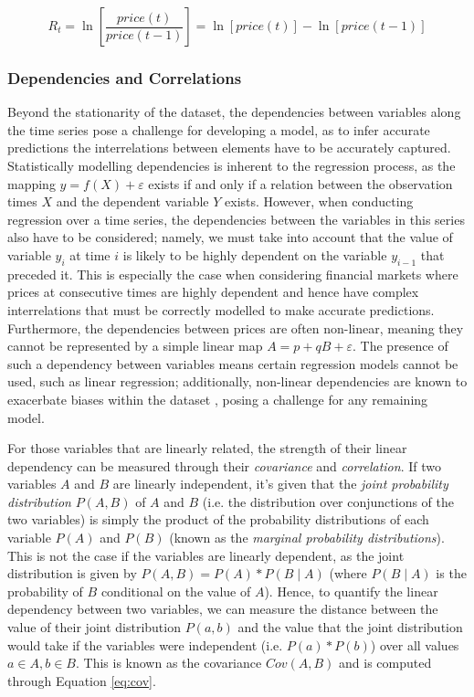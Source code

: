 \documentclass[a4paper, 11pt]{article}
\begin{document}
    \begin{equation}
        R_t = \ln \left[ \frac{price \left( t \right)}{price \left(t-1 \right)} \right] = \ln \left[ price \left(t \right) \right] - \ln \left[price \left(t-1 \right) \right]
        \label{eq:log-return}
    \end{equation}

    \subsubsection{Dependencies and Correlations}

    Beyond the stationarity of the dataset, the dependencies between variables along the time series pose a challenge for developing a model, as to infer accurate predictions the interrelations between elements have to be accurately captured. Statistically modelling dependencies is inherent to the regression process, as the mapping $y = f\left(X\right) + \varepsilon$ exists if and only if a relation between the observation times $X$ and the dependent variable $Y$ exists. However, when conducting regression over a time series, the dependencies between the variables in this series also have to be considered; namely, we must take into account that the value of variable $y_i$ at time $i$ is likely to be highly dependent on the variable $y_{i-1}$ that preceded it. This is especially the case when considering financial markets where prices at consecutive times are highly dependent and hence have complex interrelations that must be correctly modelled to make accurate predictions. Furthermore, the dependencies between prices are often non-linear, meaning they cannot be represented by a simple linear map $A = p + qB + \varepsilon$. The presence of such a dependency between variables means certain regression models cannot be used, such as linear regression; additionally, non-linear dependencies are known to exacerbate biases within the dataset \cite{phillips-2007}, posing a challenge for any remaining model.

    For those variables that are linearly related, the strength of their linear dependency can be measured through their \emph{covariance} and \emph{correlation}. If two variables $A$ and $B$ are linearly independent, it's given that the \emph{joint probability distribution} $P(A, B)$ of $A$ and $B$ (i.e. the distribution over conjunctions of the two variables) is simply the product of the probability distributions of each variable $P(A)$ and $P(B)$ (known as the \emph{marginal probability distributions}). This is not the case if the variables are linearly dependent, as the joint distribution is given by $P(A, B) = P(A) * P(B \mid A)$ (where $P(B \mid A)$ is the probability of $B$ conditional on the value of $A$). Hence, to quantify the linear dependency between two variables, we can measure the distance between the value of their joint distribution $P(a, b)$ and the value that the joint distribution would take if the variables were independent (i.e. $P(a) * P(b)$) over all values $a \in A, b \in B$. This is known as the covariance $Cov(A, B)$ and is computed through Equation \ref{eq:cov}.
\end{document}
